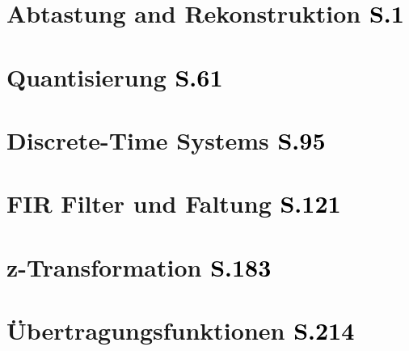 % 
% 
% 
% 
%

% 

\chapter{Abtastung and Rekonstruktion \textcolor{black}{\small S.1}}


\chapter{Quantisierung \textcolor{black}{\small S.61}}


\chapter{Discrete-Time Systems \textcolor{black}{\small S.95}}


\chapter{FIR Filter und Faltung \textcolor{black}{\small S.121}}


\chapter{z-Transformation  \textcolor{black}{\small S.183}}


\chapter{Übertragungsfunktionen \textcolor{black}{\small S.214}}


